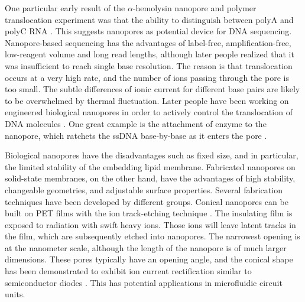 One particular early result of the $\alpha$-hemolysin nanopore and polymer translocation experiment was that the ability to distinguish between polyA and polyC RNA \cite{Akeson1999,Meller2000}. This suggests nanopores as potential device for DNA sequencing. Nanopore-based sequencing has the advantages of label-free, amplification-free, low-reagent volume and long read lengths, although later people realized that it was insufficient to reach single base resolution. The reason is that translocation occurs at a very high rate, and the number of ions passing through the pore is too small. The subtle differences of ionic current for different base pairs are likely to be overwhelmed by thermal fluctuation. Later people have been working on engineered biological nanopores in order to actively control the translocation of DNA molecules  \cite{BayleyBook,gu1999stochastic,movileanu2000detecting,howorka2001sequence,benner2007sequence,cockroft2008single,lieberman2010processive}. One great example is the attachment of enzyme to the nanopore, which ratchets the ssDNA base-by-base as it enters the pore \cite{cockroft2008single}.

Biological nanopores have the disadvantages such as fixed size, and in particular, the limited stability of the embedding lipid membrane. Fabricated nanopores on solid-state membranes, on the other hand, have the advantages of high stability, changeable geometries, and adjustable surface properties. Several fabrication techniques have been developed by different groups. Conical nanopores can be built on PET films with the ion track-etching technique \cite{siwy2002fabrication}. The insulating film is exposed to radiation with swift heavy ions. Those ions will leave latent tracks in the film, which are subsequently etched into nanopores. The narrowest opening is at the nanometer scale, although the length of the nanopore is of much larger dimensions. These pores typically have an opening angle, and the conical shape has been demonstrated to exhibit ion current rectification similar to semiconductor diodes \cite{Siwy2004,siwy2006,Vlassiouk2007,Vlassiouk2008}. This has potential applications in microfluidic circuit units.

